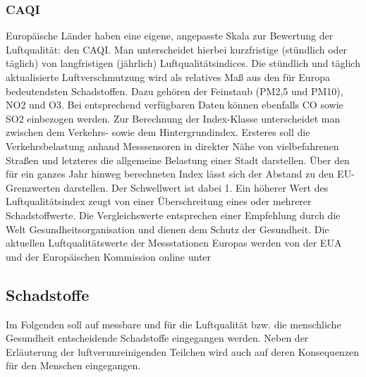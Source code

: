 \subsubsection{\acf{CAQI}}
Europäische Länder haben eine eigene, angepasste Skala zur Bewertung der Luftqualität: den \acf{CAQI}. Man unterscheidet hierbei kurzfristige (stündlich oder täglich) von langfristigen (jährlich) Luftqualitätsindices. 
Die stündlich und täglich aktualisierte Luftverschmutzung wird als relatives Maß aus den für Europa bedeutendsten Schadstoffen. Dazu gehören der Feinstaub (PM2,5 und PM10), \acs{NO2} und \acs{O3}. Bei entsprechend verfügbaren Daten können ebenfalls \acf{CO} sowie \acs{SO2} einbezogen werden. Zur Berechnung der Index-Klasse unterscheidet man zwischen dem Verkehrs- sowie dem Hintergrundindex. Ersteres soll die Verkehrsbelastung anhand Messsensoren in direkter Nähe von vielbefahrenen Straßen und letzteres die allgemeine Belastung einer Stadt darstellen. 
\newline
Über den für ein ganzes Jahr hinweg berechneten Index lässt sich der Abstand zu den EU-Grenzwerten darstellen. Der Schwellwert ist dabei 1. Ein höherer Wert des Luftqualitätsindex zeugt von einer Überschreitung eines oder mehrerer Schadstoffwerte. Die Vergleichswerte entsprechen einer Empfehlung durch die Welt Gesundheitsorganisation und dienen dem Schutz der Gesundheit. 
\newline
Die aktuellen Luftqualitätswerte der Messstationen Europas werden von der EUA und der Europäischen Kommission online unter 
\subsection{Schadstoffe}
Im Folgenden soll auf messbare und für die Luftqualität bzw. die menschliche Gesundheit entscheidende Schadstoffe eingegangen werden. Neben der Erläuterung der luftverunreinigenden Teilchen wird auch auf deren Konsequenzen für den Menschen eingegangen. 
